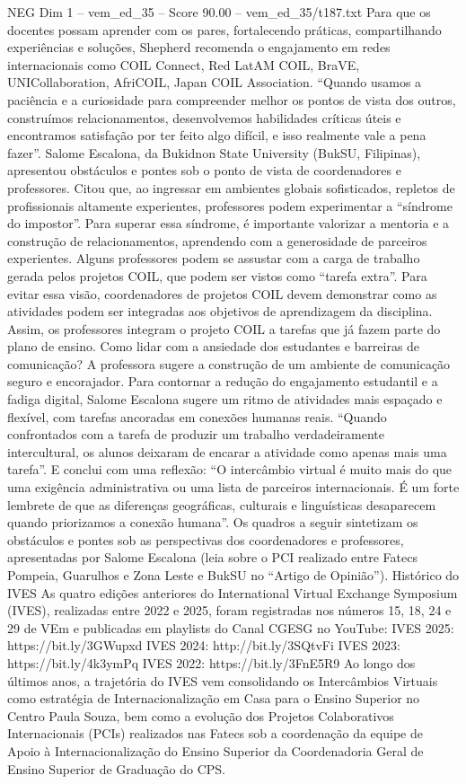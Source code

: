 \begin{textsample}{NEG Dim 1 – vem\_ed\_35 – Score 90.00 – vem\_ed\_35/t187.txt}
Para que os docentes possam aprender com os pares, fortalecendo práticas, compartilhando experiências e soluções, Shepherd recomenda o engajamento em redes internacionais como COIL Connect, Red LatAM COIL, BraVE, UNICollaboration, AfriCOIL, Japan COIL Association. “Quando usamos a paciência e a curiosidade para compreender melhor os pontos de vista dos outros, construímos relacionamentos, desenvolvemos habilidades críticas úteis e encontramos satisfação por ter feito algo difícil, e isso realmente vale a pena fazer”.
Salome Escalona, da Bukidnon State University (BukSU, Filipinas), apresentou obstáculos e pontes sob o ponto de vista de coordenadores e professores.
Citou que, ao ingressar em ambientes globais sofisticados, repletos de profissionais altamente experientes, professores podem experimentar a “síndrome do impostor”.
Para superar essa síndrome, é importante valorizar a mentoria e a construção de relacionamentos, aprendendo com a generosidade de parceiros experientes.
Alguns professores podem se assustar com a carga de trabalho gerada pelos projetos COIL, que podem ser vistos como “tarefa extra”.
Para evitar essa visão, coordenadores de projetos COIL devem demonstrar como as atividades podem ser integradas aos objetivos de aprendizagem da disciplina.
Assim, os professores integram o projeto COIL a tarefas que já fazem parte do plano de ensino.
Como lidar com a ansiedade dos estudantes e barreiras de comunicação?
A professora sugere a construção de um ambiente de comunicação seguro e encorajador.
Para contornar a redução do engajamento estudantil e a fadiga digital, Salome Escalona sugere um ritmo de atividades mais espaçado e flexível, com tarefas ancoradas em conexões humanas reais. “Quando confrontados com a tarefa de produzir um trabalho verdadeiramente intercultural, os alunos deixaram de encarar a atividade como apenas mais uma tarefa”.
E conclui com uma reflexão: “O intercâmbio virtual é muito mais do que uma exigência administrativa ou uma lista de parceiros internacionais.
É um forte lembrete de que as diferenças geográficas, culturais e linguísticas desaparecem quando priorizamos a conexão humana”.
Os quadros a seguir sintetizam os obstáculos e pontes sob as perspectivas dos coordenadores e professores, apresentadas por Salome Escalona (leia sobre o PCI realizado entre Fatecs Pompeia, Guarulhos e Zona Leste e BukSU no “Artigo de Opinião”).
Histórico do IVES As quatro edições anteriores do International Virtual Exchange Symposium (IVES), realizadas entre 2022 e 2025, foram registradas nos números 15, 18, 24 e 29 de VEm e publicadas em playlists do Canal CGESG no YouTube: IVES 2025: https://bit.ly/3GWupxd IVES 2024: http://bit.ly/3SQtvFi IVES 2023: https://bit.ly/4k3ymPq IVES 2022: https://bit.ly/3FnE5R9 Ao longo dos últimos anos, a trajetória do IVES vem consolidando os Intercâmbios Virtuais como estratégia de Internacionalização em Casa para o Ensino Superior no Centro Paula Souza, bem como a evolução dos Projetos Colaborativos Internacionais (PCIs) realizados nas Fatecs sob a coordenação da equipe de Apoio à Internacionalização do Ensino Superior da Coordenadoria Geral de Ensino Superior de Graduação do CPS.

\end{textsample}
